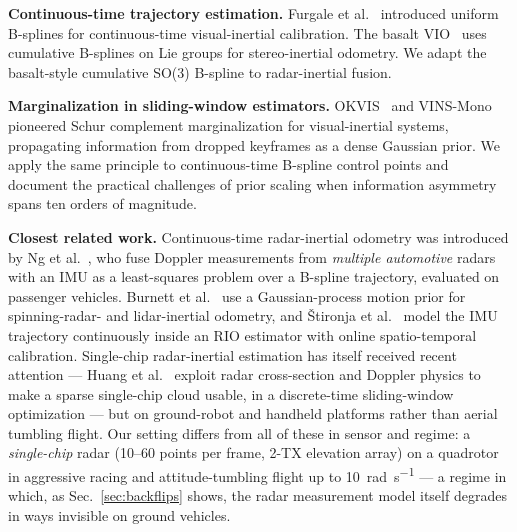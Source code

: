 \documentclass[journal]{IEEEtran}
\begin{document}
\textbf{Continuous-time trajectory estimation.}
Furgale et al.~\cite{furgale2013unified} introduced uniform B-splines
for continuous-time visual-inertial calibration.  The basalt
VIO~\cite{usenko2020basalt} uses cumulative B-splines on Lie groups
for stereo-inertial odometry. We adapt the basalt-style cumulative
SO(3) B-spline to radar-inertial fusion.

\textbf{Marginalization in sliding-window estimators.}
OKVIS~\cite{leutenegger2015keyframe} and
VINS-Mono~\cite{qin2018vins} pioneered Schur complement
marginalization for visual-inertial systems, propagating information
from dropped keyframes as a dense Gaussian prior. We apply the same
principle to continuous-time B-spline control points and document
the practical challenges of prior scaling when information asymmetry
spans ten orders of magnitude.

\textbf{Closest related work.}
Continuous-time radar-inertial odometry was introduced by
Ng et al.~\cite{ng2021ctrio}, who fuse Doppler measurements from
\emph{multiple automotive} radars with an IMU as a least-squares
problem over a B-spline trajectory, evaluated on passenger vehicles.
Burnett et al.~\cite{burnett2024gp} use a Gaussian-process motion
prior for spinning-radar- and lidar-inertial odometry, and
\v{S}tironja et al.~\cite{stironja2026rio} model the IMU trajectory
continuously inside an RIO estimator with online spatio-temporal
calibration.  Single-chip radar-inertial estimation has itself
received recent attention --- Huang et al.~\cite{huang2024lessismore}
exploit radar cross-section and Doppler physics to make a sparse
single-chip cloud usable, in a discrete-time sliding-window
optimization --- but on ground-robot and handheld platforms rather
than aerial tumbling flight.
Our setting differs from all of these in sensor and
regime: a \emph{single-chip} radar (10--60 points per frame,
2-TX elevation array) on a quadrotor in aggressive racing and
attitude-tumbling flight up to \SI{10}{\radian\per\second} --- a
regime in which, as Sec.~\ref{sec:backflips} shows, the radar
measurement model itself degrades in ways invisible on ground
vehicles.
\end{document}
